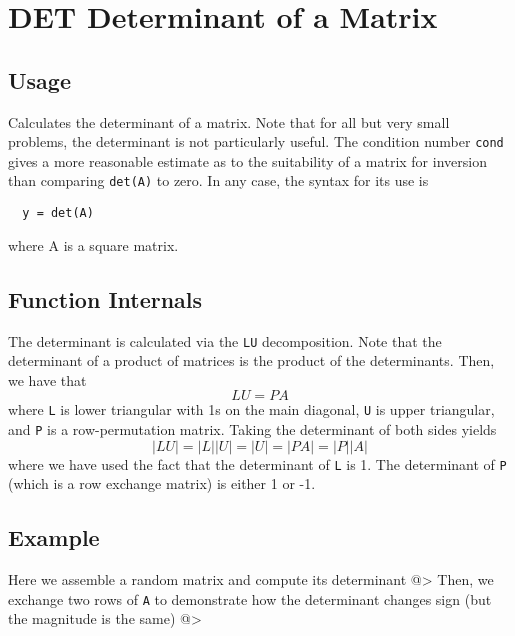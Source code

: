 \section{DET Determinant of a Matrix}

\subsection{Usage}

Calculates the determinant of a matrix.  Note that for all but
very small problems, the determinant is not particularly useful.
The condition number \verb|cond| gives a more reasonable estimate as
to the suitability of a matrix for inversion than comparing \verb|det(A)|
to zero.  In any case, the syntax for its use is
\begin{verbatim}
  y = det(A)
\end{verbatim}
where A is a square matrix.
\subsection{Function Internals}

The determinant is calculated via the \verb|LU| decomposition.  Note that
the determinant of a product of matrices is the product of the 
determinants.  Then, we have that 
\[
  L U = P A
\]
where \verb|L| is lower triangular with 1s on the main diagonal, \verb|U| is
upper triangular, and \verb|P| is a row-permutation matrix.  Taking the
determinant of both sides yields
\[
 |L U| = |L| |U| = |U| = |P A| = |P| |A|
\]
where we have used the fact that the determinant of \verb|L| is 1.  The
determinant of \verb|P| (which is a row exchange matrix) is either 1 or 
-1.
\subsection{Example}

Here we assemble a random matrix and compute its determinant
@>
Then, we exchange two rows of \verb|A| to demonstrate how the determinant
changes sign (but the magnitude is the same)
@>
